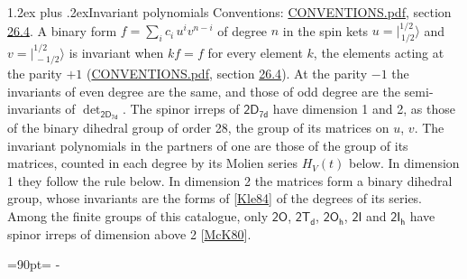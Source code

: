 \documentclass[10pt,a4paper]{article}
\makeatletter
\renewcommand\section{\@startsection{section}{1}{\z@}{-3ex plus -1ex minus -.2ex}%
  {1.2ex plus .2ex}{\normalfont\large\sffamily\bfseries\color{parttitle}}}
\newcommand{\needspace}[1]{\par\penalty-100\begingroup\dimen0=#1\relax\dimen2=\pagegoal
  \advance\dimen2-\pagetotal\ifdim\dimen0>\dimen2\relax\ifdim\dimen2>0pt\vfil\break\fi\fi
  \endgroup}
\numberwithin{equation}{section}
\newcommand{\grp}[1]{\mathsf{#1}}
\newcommand{\jm}[2]{\bigl\lvert{}^{#1}_{\,#2}\bigr\rangle}
\makeatother
\begin{document}
\section{Invariant polynomials}\label{s:invariants}
Conventions: \href{../../CONVENTIONS.pdf}{CONVENTIONS.pdf}, section \href{../../CONVENTIONS.pdf\#conv.26.4}{26.4}.
\leavevmode\label{n:local.binary.form}A binary form $f = \sum_i c_i\, u^i v^{n-i}$ of degree $n$ in the spin kets $u = \jm{1/2}{1/2}$ and $v = \jm{1/2}{-1/2}$ is invariant when $k f = f$ for every element $k$, the elements acting at the parity $+1$ (\href{../../CONVENTIONS.pdf}{CONVENTIONS.pdf}, section \href{../../CONVENTIONS.pdf\#conv.26.4}{26.4}). At the parity $-1$ the invariants of even degree are the same, and those of odd degree are the semi-invariants of $\det_{\grp{2D_{7d}}}$.
The spinor irreps of $\grp{2D_{7d}}$ have dimension 1 and 2, as those of the binary dihedral group of order 28, the group of its matrices on $u$, $v$. \label{n:function.hilbert}The invariant polynomials in the partners of one are those of the group of its matrices, counted in each degree by its Molien series $H_V(t)$ below. In dimension 1 they follow the rule below. In dimension 2 the matrices form a binary dihedral group, whose invariants are the forms of [\href{../../../REFERENCES.pdf\#ref.Kle84}{Kle84}] of the degrees of its series. Among the finite groups of this catalogue, only $\grp{2O}$, $\grp{2T_{d}}$, $\grp{2O_{h}}$, $\grp{2I}$ and $\grp{2I_{h}}$ have spinor irreps of dimension above 2 [\href{../../../REFERENCES.pdf\#ref.McK80}{McK80}].
\needspace{90pt}
\end{document}
